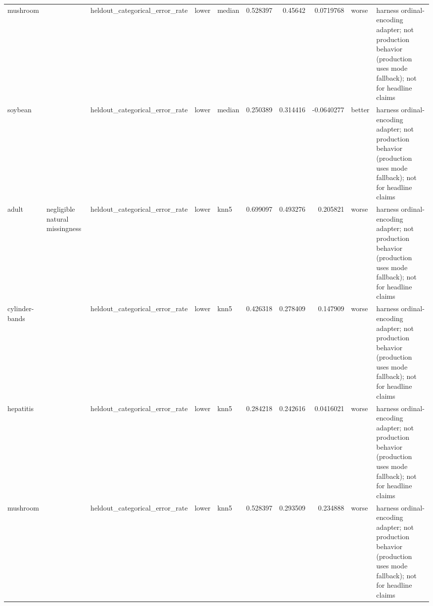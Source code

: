 \begin{table}[ht]
{\begin{tabular}{lllllrrrll}
 mushroom       &                                                                       & heldout\_categorical\_error\_rate & lower              & median           &                   0.528397 &               0.45642  &                     0.0719768   & worse                & harness ordinal-encoding adapter; not production behavior (production uses mode fallback); not for headline claims \\
 soybean        &                                                                       & heldout\_categorical\_error\_rate & lower              & median           &                   0.250389 &               0.314416 &                    -0.0640277   & better               & harness ordinal-encoding adapter; not production behavior (production uses mode fallback); not for headline claims \\
 adult          & negligible natural missingness                                        & heldout\_categorical\_error\_rate & lower              & knn5             &                   0.699097 &               0.493276 &                     0.205821    & worse                & harness ordinal-encoding adapter; not production behavior (production uses mode fallback); not for headline claims \\
 cylinder-bands &                                                                       & heldout\_categorical\_error\_rate & lower              & knn5             &                   0.426318 &               0.278409 &                     0.147909    & worse                & harness ordinal-encoding adapter; not production behavior (production uses mode fallback); not for headline claims \\
 hepatitis      &                                                                       & heldout\_categorical\_error\_rate & lower              & knn5             &                   0.284218 &               0.242616 &                     0.0416021   & worse                & harness ordinal-encoding adapter; not production behavior (production uses mode fallback); not for headline claims \\
 mushroom       &                                                                       & heldout\_categorical\_error\_rate & lower              & knn5             &                   0.528397 &               0.293509 &                     0.234888    & worse                & harness ordinal-encoding adapter; not production behavior (production uses mode fallback); not for headline claims \\

\end{tabular}}
\end{table}
